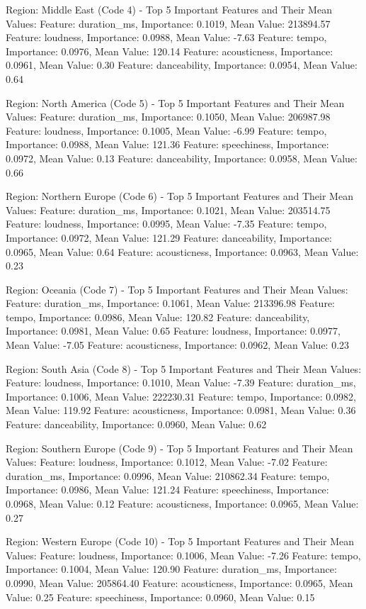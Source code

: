 Region: Middle East (Code 4) - Top 5 Important Features and Their Mean Values:
Feature: duration\_ms, Importance: 0.1019, Mean Value: 213894.57
Feature: loudness, Importance: 0.0988, Mean Value: -7.63
Feature: tempo, Importance: 0.0976, Mean Value: 120.14
Feature: acousticness, Importance: 0.0961, Mean Value: 0.30
Feature: danceability, Importance: 0.0954, Mean Value: 0.64

Region: North America (Code 5) - Top 5 Important Features and Their Mean Values:
Feature: duration\_ms, Importance: 0.1050, Mean Value: 206987.98
Feature: loudness, Importance: 0.1005, Mean Value: -6.99
Feature: tempo, Importance: 0.0988, Mean Value: 121.36
Feature: speechiness, Importance: 0.0972, Mean Value: 0.13
Feature: danceability, Importance: 0.0958, Mean Value: 0.66

Region: Northern Europe (Code 6) - Top 5 Important Features and Their Mean Values:
Feature: duration\_ms, Importance: 0.1021, Mean Value: 203514.75
Feature: loudness, Importance: 0.0995, Mean Value: -7.35
Feature: tempo, Importance: 0.0972, Mean Value: 121.29
Feature: danceability, Importance: 0.0965, Mean Value: 0.64
Feature: acousticness, Importance: 0.0963, Mean Value: 0.23

Region: Oceania (Code 7) - Top 5 Important Features and Their Mean Values:
Feature: duration\_ms, Importance: 0.1061, Mean Value: 213396.98
Feature: tempo, Importance: 0.0986, Mean Value: 120.82
Feature: danceability, Importance: 0.0981, Mean Value: 0.65
Feature: loudness, Importance: 0.0977, Mean Value: -7.05
Feature: acousticness, Importance: 0.0962, Mean Value: 0.23

Region: South Asia (Code 8) - Top 5 Important Features and Their Mean Values:
Feature: loudness, Importance: 0.1010, Mean Value: -7.39
Feature: duration\_ms, Importance: 0.1006, Mean Value: 222230.31
Feature: tempo, Importance: 0.0982, Mean Value: 119.92
Feature: acousticness, Importance: 0.0981, Mean Value: 0.36
Feature: danceability, Importance: 0.0960, Mean Value: 0.62

Region: Southern Europe (Code 9) - Top 5 Important Features and Their Mean Values:
Feature: loudness, Importance: 0.1012, Mean Value: -7.02
Feature: duration\_ms, Importance: 0.0996, Mean Value: 210862.34
Feature: tempo, Importance: 0.0986, Mean Value: 121.24
Feature: speechiness, Importance: 0.0968, Mean Value: 0.12
Feature: acousticness, Importance: 0.0965, Mean Value: 0.27

Region: Western Europe (Code 10) - Top 5 Important Features and Their Mean Values:
Feature: loudness, Importance: 0.1006, Mean Value: -7.26
Feature: tempo, Importance: 0.1004, Mean Value: 120.90
Feature: duration\_ms, Importance: 0.0990, Mean Value: 205864.40
Feature: acousticness, Importance: 0.0965, Mean Value: 0.25
Feature: speechiness, Importance: 0.0960, Mean Value: 0.15

